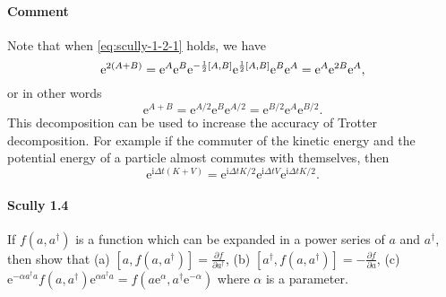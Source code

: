\documentclass[hyperref, a4paper]{article}
\newcommand*{\ii}{\mathrm{i}}
\newcommand*{\ee}{\mathrm{e}}
\begin{document}
\paragraph{Comment} Note that when \eqref{eq:scully-1-2-1} holds, we have 
\begin{equation}
    \ee^{2(A+B)} = \ee^{A} \ee^{B} \ee^{- \frac{1}{2} \comm*{A}{B}} \ee^{\frac{1}{2} \comm*{A}{B}} \ee^{B} \ee^{A} = \ee^{A} \ee^{2B} \ee^{A},
\end{equation}
or in other words
\begin{equation}
    \ee^{A+B} = \ee^{A/2} \ee^{B} \ee^{A/2} = \ee^{B/2} \ee^{A} \ee^{B/2}.
\end{equation}
This decomposition can be used to increase the accuracy of Trotter decomposition.
For example if the commuter of the kinetic energy and the potential energy of a particle almost commutes with themselves, then 
\begin{equation}
    \ee^{\ii \Delta t (K+V)} = \ee^{\ii \Delta t K / 2} \ee^{\ii \Delta t V} \ee^{\ii \Delta t K / 2}.
\end{equation}

\paragraph{}

\paragraph{Scully 1.4} If $f\left(a, a^{\dagger}\right)$ is a function which can be expanded in a power series of $a$ and $a^{\dagger}$, then show that
(a) $\left[a, f\left(a, a^{\dagger}\right)\right]=\frac{\partial f}{\partial a^{\dagger}}$,
(b) $\left[a^{\dagger}, f\left(a, a^{\dagger}\right)\right]=-\frac{\partial f}{\partial a}$,
(c) $\ee^{-\alpha a^{\dagger} a} f\left(a, a^{\dagger}\right) \ee^{\alpha a^{\dagger} a}=f\left(a \ee^{\alpha}, a^{\dagger} \ee^{-\alpha}\right)$
where $\alpha$ is a parameter.
\end{document}

